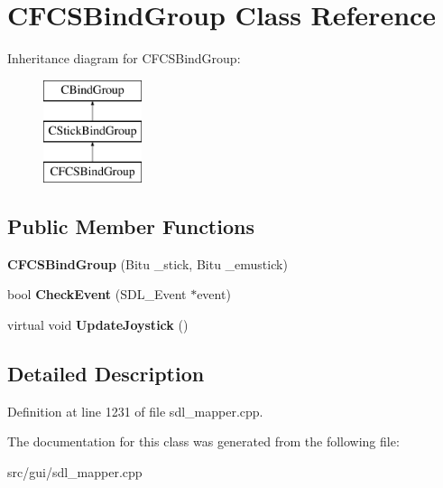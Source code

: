 \hypertarget{classCFCSBindGroup}{\section{C\-F\-C\-S\-Bind\-Group Class Reference}
\label{classCFCSBindGroup}
}
Inheritance diagram for C\-F\-C\-S\-Bind\-Group\-:\begin{figure}[H]
\begin{center}
\leavevmode
\includegraphics[height=3.000000cm]{classCFCSBindGroup}
\end{center}
\end{figure}
\subsection*{Public Member Functions}
\begin{DoxyCompactItemize}
\item 
\hypertarget{classCFCSBindGroup_a366a39efa7db658cfdec657580818264}{{\bfseries C\-F\-C\-S\-Bind\-Group} (Bitu \-\_\-stick, Bitu \-\_\-emustick)}\label{classCFCSBindGroup_a366a39efa7db658cfdec657580818264}

\item 
\hypertarget{classCFCSBindGroup_a25a662090cb26b626cac51449c94e3af}{bool {\bfseries Check\-Event} (S\-D\-L\-\_\-\-Event $\ast$event)}\label{classCFCSBindGroup_a25a662090cb26b626cac51449c94e3af}

\item 
\hypertarget{classCFCSBindGroup_a19be69d6c38cc544b2b4517eeab84fef}{virtual void {\bfseries Update\-Joystick} ()}\label{classCFCSBindGroup_a19be69d6c38cc544b2b4517eeab84fef}

\end{DoxyCompactItemize}


\subsection{Detailed Description}


Definition at line 1231 of file sdl\-\_\-mapper.\-cpp.



The documentation for this class was generated from the following file\-:\begin{DoxyCompactItemize}
\item 
src/gui/sdl\-\_\-mapper.\-cpp\end{DoxyCompactItemize}
